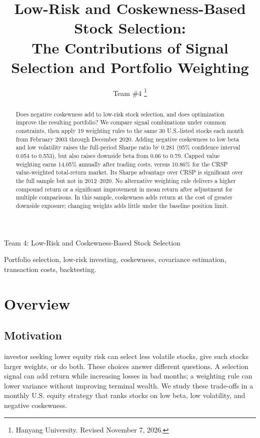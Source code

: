\documentclass[letterpaper,journal]{IEEEtran}
\begin{document}
\title{Low-Risk and Coskewness-Based Stock Selection:\\The Contributions of Signal Selection and Portfolio Weighting}
\author{Team \#4
\thanks{Hanyang University. Revised November 7, 2026.}}

%
{Team 4: Low-Risk and Coskewness-Based Stock Selection}

\maketitle
\raggedbottom
\begin{abstract}
Does negative coskewness add to low-risk stock selection, and does optimization improve the resulting portfolio? We compare signal combinations under common constraints, then apply 19 weighting rules to the same 30 U.S.-listed stocks each month from February 2003 through December 2020. Adding negative coskewness to low beta and low volatility raises the full-period Sharpe ratio by 0.281 (95\% confidence interval 0.054 to 0.553), but also raises downside beta from 0.66 to 0.79. Capped value weighting earns 14.05\% annually after trading costs, versus 10.86\% for the CRSP value-weighted total-return market. Its Sharpe advantage over CRSP is significant over the full sample but not in 2012--2020. No alternative weighting rule delivers a higher compound return or a significant improvement in mean return after adjustment for multiple comparisons. In this sample, coskewness adds return at the cost of greater downside exposure; changing weights adds little under the baseline position limit.
\end{abstract}
\begin{IEEEkeywords}
Portfolio selection, low-risk investing, coskewness, covariance estimation, transaction costs, backtesting.
\end{IEEEkeywords}

\section{Overview}\label{sec:overview}
\subsection{Motivation}
 investor seeking lower equity risk can select less volatile stocks, give such stocks larger weights, or do both. These choices answer different questions. A selection signal can add return while increasing losses in bad months; a weighting rule can lower variance without improving terminal wealth. We study these trade-offs in a monthly U.S. equity strategy that ranks stocks on low beta, low volatility, and negative coskewness.
\end{document}
